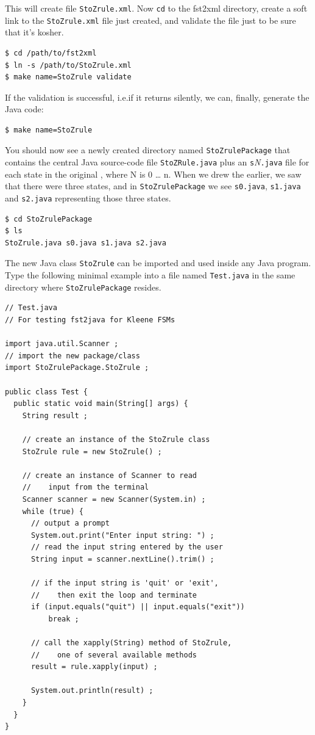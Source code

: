 \noindent
This will create file \texttt{StoZrule.xml}.  Now \texttt{cd} to the
fst2xml directory, create a soft link to the \texttt{StoZrule.xml}
file just created, and validate the file just to be sure that it's
kosher.

\begin{Verbatim}
$ cd /path/to/fst2xml
$ ln -s /path/to/StoZrule.xml
$ make name=StoZrule validate
\end{Verbatim}

If the validation is successful, i.e.\@ if it returns silently, 
we can, finally, generate the Java code:

\begin{Verbatim}
$ make name=StoZrule
\end{Verbatim}

\noindent
You should now see a newly created directory named \texttt{StoZrulePackage}
that contains the central Java source-code
file \texttt{StoZRule.java} plus an \texttt{s}\emph{N}\texttt{.java}
file for each state in the original \fsm{}, where N is 0 \ldots{} n.
When we drew the \fsm{} earlier, we saw that there were three states,
and in \texttt{StoZrulePackage} we see \texttt{s0.java},
\texttt{s1.java} and \texttt{s2.java} representing those three states.

\begin{Verbatim}
$ cd StoZrulePackage
$ ls
StoZrule.java s0.java s1.java s2.java
\end{Verbatim}

The new Java class \texttt{StoZrule} can be imported and used inside any Java
program.  Type the following minimal example into a file named
\texttt{Test.java} in the same directory where \texttt{StoZrulePackage} resides.

\begin{Verbatim}
// Test.java
// For testing fst2java for Kleene FSMs

import java.util.Scanner ;
// import the new package/class
import StoZrulePackage.StoZrule ; 

public class Test {
  public static void main(String[] args) {
    String result ;

    // create an instance of the StoZrule class
    StoZrule rule = new StoZrule() ;

    // create an instance of Scanner to read
    //    input from the terminal
    Scanner scanner = new Scanner(System.in) ;
    while (true) {
      // output a prompt
      System.out.print("Enter input string: ") ;
      // read the input string entered by the user
      String input = scanner.nextLine().trim() ;

      // if the input string is 'quit' or 'exit',
      //    then exit the loop and terminate
      if (input.equals("quit") || input.equals("exit"))
          break ;

      // call the xapply(String) method of StoZrule,
      //    one of several available methods
      result = rule.xapply(input) ;

      System.out.println(result) ;
    }
  }
}
\end{Verbatim}


